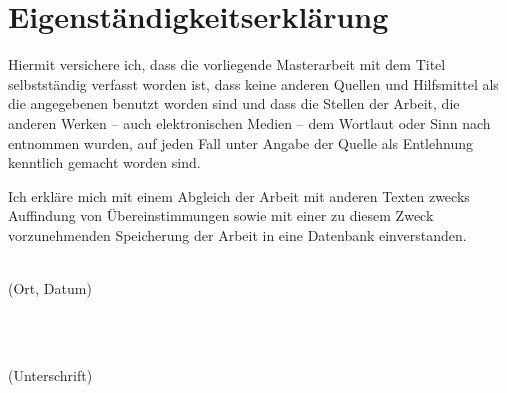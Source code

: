 %
\chapter*{Eigenständigkeitserklärung}
\label{sec:declaration}

Hiermit versichere ich, dass die vorliegende Masterarbeit mit dem Titel \textit{\thesisTitle} selbstständig verfasst worden ist, dass keine anderen Quellen und Hilfsmittel als die angegebenen benutzt worden sind und dass die Stellen der Arbeit, die anderen Werken -- auch elektronischen Medien -- dem Wortlaut oder Sinn nach entnommen wurden, auf jeden Fall unter Angabe der Quelle als Entlehnung kenntlich gemacht worden sind.

Ich erkläre mich mit einem Abgleich der Arbeit mit anderen Texten zwecks Auffindung von Übereinstimmungen sowie mit einer zu diesem Zweck vorzunehmenden Speicherung der Arbeit in eine Datenbank einverstanden.

\vspace*{2cm}

\begin{minipage}{0.5\textwidth}
	\begin{flushleft} \large
		\underline{\hspace{6cm}} \\
		{\footnotesize (Ort, Datum)}
	\end{flushleft}
\end{minipage}
~
\begin{minipage}{0.5\textwidth}
	\begin{flushright} \large
		\underline{\hspace{6cm}} \\
		{\footnotesize (Unterschrift)}
	\end{flushright}
\end{minipage}\\[0.5cm]

